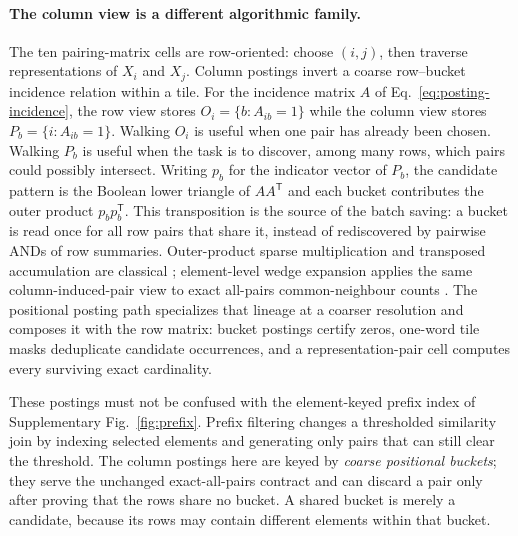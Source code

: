 \paragraph*{The column view is a different algorithmic family.}
The ten pairing-matrix cells are row-oriented: choose $(i,j)$, then traverse representations of
$X_i$ and $X_j$. Column postings invert a coarse row--bucket incidence relation within a tile. For
the incidence matrix $A$ of Eq.~\eqref{eq:posting-incidence}, the row view stores
$O_i=\{b:A_{ib}=1\}$ while the column view stores $P_b=\{i:A_{ib}=1\}$. Walking $O_i$ is useful when
one pair has already been chosen. Walking $P_b$ is useful when the task is to discover, among many
rows, which pairs could possibly intersect. Writing $p_b$ for the indicator vector of $P_b$, the
candidate pattern is the Boolean lower triangle of $AA^{\mathsf T}$ and each bucket contributes the
outer product $p_bp_b^{\mathsf T}$. This transposition is the source of the batch saving: a bucket is
read once for all row pairs that share it, instead of rediscovered by pairwise ANDs of row summaries.
Outer-product sparse multiplication and transposed accumulation are classical
\cite{gustavson1978spgemm,buluc2011combinatorialblas}; element-level wedge expansion applies the same
column-induced-pair view to exact all-pairs common-neighbour counts
\cite{an2019skipintersection}. The positional posting path specializes that lineage at a coarser
resolution and composes it with the row matrix: bucket postings certify zeros, one-word tile masks
deduplicate candidate occurrences, and a representation-pair cell computes every surviving exact
cardinality.

These postings must not be confused with the element-keyed prefix index of Supplementary
Fig.~\ref{fig:prefix}. Prefix filtering changes a thresholded similarity join by indexing selected
elements and generating only pairs that can still clear the threshold. The column postings here are
keyed by \emph{coarse positional buckets}; they serve the unchanged exact-all-pairs contract and can
discard a pair only after proving that the rows share no bucket. A shared bucket is merely a
candidate, because its rows may contain different elements within that bucket.

